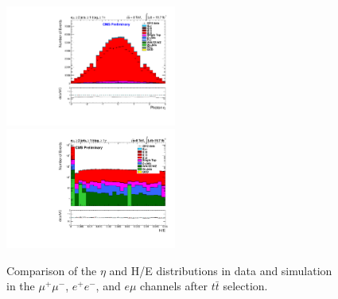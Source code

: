 \documentclass[oneside, a4paper, 11pt, ]{report}
\begin{document}
\begin{figure}
\includegraphics[width=0.5\textwidth]{Plots/ControlPlots/TTbarDiLeptonAnalysis/EMu/Photons/AllPhotons/Photon_Eta_splitTTbar_ratio.pdf}
\includegraphics[width=0.5\textwidth]{Plots/ControlPlots/TTbarDiLeptonAnalysis/EMu/Photons/AllPhotons/Log/Photon_HtowoE_splitTTbar_ratio.pdf}
\caption{Comparison of the $\eta$ and H/E distributions in data and simulation in the $\mu^{+}\mu^{-}$, $e^{+}e^{-}$, and $e\mu$ channels after $t\bar{t}$ selection.}
\label{fig-ttbarEtaAndHoverE}
\end{figure}
\end{document}
